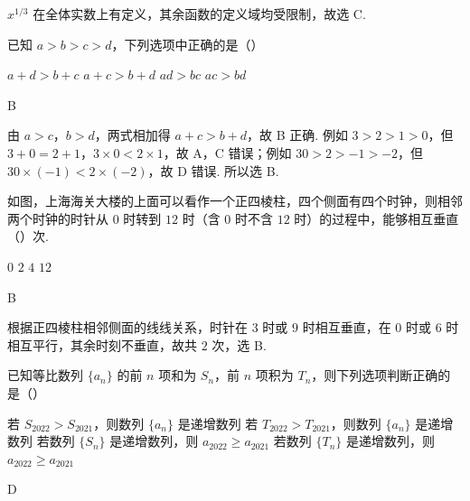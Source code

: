 \begin{solution}
\(x^{1/3}\) 在全体实数上有定义，其余函数的定义域均受限制，故选 C.
\end{solution}

\begin{problem}
已知 \(a>b>c>d\)，下列选项中正确的是（\quad）

\choices
    {\(a+d>b+c\)}
    {\(a+c>b+d\)}
    {\(ad>bc\)}
    {\(ac>bd\)}
\end{problem}

\begin{answer}
B
\end{answer}

\begin{solution}
由 \(a>c\)，\(b>d\)，两式相加得 \(a+c>b+d\)，故 B 正确. 例如 \(3>2>1>0\)，但 \(3+0=2+1\)，\(3\times0<2\times1\)，故 A，C 错误；例如 \(30>2>-1>-2\)，但 \(30\times(-1)<2\times(-2)\)，故 D 错误. 所以选 B.
\end{solution}

\begin{problem}
如图，上海海关大楼的上面可以看作一个正四棱柱，四个侧面有四个时钟，则相邻两个时钟的时针从 \(0\) 时转到 \(12\) 时（含 \(0\) 时不含 \(12\) 时）的过程中，能够相互垂直（\quad）次.


\choices
    {\(0\)}
    {\(2\)}
    {\(4\)}
    {\(12\)}
\end{problem}

\begin{answer}
B
\end{answer}

\begin{solution}
根据正四棱柱相邻侧面的线线关系，时针在 \(3\) 时或 \(9\) 时相互垂直，在 \(0\) 时或 \(6\) 时相互平行，其余时刻不垂直，故共 \(2\) 次，选 B.
\end{solution}

\begin{problem}
已知等比数列 \(\{a_n\}\) 的前 \(n\) 项和为 \(S_n\)，前 \(n\) 项积为 \(T_n\)，则下列选项判断正确的是（\quad）

\choices
    {若 \(S_{2022}>S_{2021}\)，则数列 \(\{a_n\}\) 是递增数列}
    {若 \(T_{2022}>T_{2021}\)，则数列 \(\{a_n\}\) 是递增数列}
    {若数列 \(\{S_n\}\) 是递增数列，则 \(a_{2022}\ge a_{2021}\)}
    {若数列 \(\{T_n\}\) 是递增数列，则 \(a_{2022}\ge a_{2021}\)}
\end{problem}

\begin{answer}
D
\end{answer}

